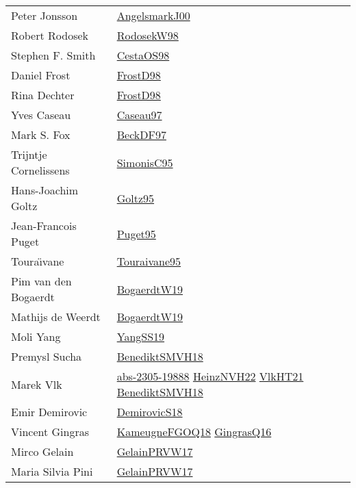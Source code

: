 {\begin{longtable}{p{4cm}p{15cm}}
Peter Jonsson & \href{papers/AngelsmarkJ00.pdf}{AngelsmarkJ00}\cite{AngelsmarkJ00} \\
Robert Rodosek & \href{papers/RodosekW98.pdf}{RodosekW98}\cite{RodosekW98} \\
Stephen F. Smith & \href{papers/CestaOS98.pdf}{CestaOS98}\cite{CestaOS98} \\
Daniel Frost & \href{papers/FrostD98.pdf}{FrostD98}\cite{FrostD98} \\
Rina Dechter & \href{papers/FrostD98.pdf}{FrostD98}\cite{FrostD98} \\
Yves Caseau & \href{papers/Caseau97.pdf}{Caseau97}\cite{Caseau97} \\
Mark S. Fox & \href{papers/BeckDF97.pdf}{BeckDF97}\cite{BeckDF97} \\
Trijntje Cornelissens & \href{papers/SimonisC95.pdf}{SimonisC95}\cite{SimonisC95} \\
Hans{-}Joachim Goltz & \href{papers/Goltz95.pdf}{Goltz95}\cite{Goltz95} \\
Jean{-}Francois Puget & \href{papers/Puget95.pdf}{Puget95}\cite{Puget95} \\
Toura{\"{\i}}vane & \href{papers/Touraivane95.pdf}{Touraivane95}\cite{Touraivane95} \\
Pim van den Bogaerdt & \href{papers/BogaerdtW19.pdf}{BogaerdtW19}\cite{BogaerdtW19} \\
Mathijs de Weerdt & \href{papers/BogaerdtW19.pdf}{BogaerdtW19}\cite{BogaerdtW19} \\
Moli Yang & \href{papers/YangSS19.pdf}{YangSS19}\cite{YangSS19} \\
Premysl Sucha & \href{papers/BenediktSMVH18.pdf}{BenediktSMVH18}\cite{BenediktSMVH18} \\
Marek Vlk & \href{articles/abs-2305-19888.pdf}{abs-2305-19888}\cite{abs-2305-19888} \href{articles/HeinzNVH22.pdf}{HeinzNVH22}\cite{HeinzNVH22} \href{articles/VlkHT21.pdf}{VlkHT21}\cite{VlkHT21} \href{papers/BenediktSMVH18.pdf}{BenediktSMVH18}\cite{BenediktSMVH18} \\
Emir Demirovic & \href{papers/DemirovicS18.pdf}{DemirovicS18}\cite{DemirovicS18} \\
Vincent Gingras & \href{papers/KameugneFGOQ18.pdf}{KameugneFGOQ18}\cite{KameugneFGOQ18} \href{papers/GingrasQ16.pdf}{GingrasQ16}\cite{GingrasQ16} \\
Mirco Gelain & \href{papers/GelainPRVW17.pdf}{GelainPRVW17}\cite{GelainPRVW17} \\
Maria Silvia Pini & \href{papers/GelainPRVW17.pdf}{GelainPRVW17}\cite{GelainPRVW17} \\

\end{longtable}}
